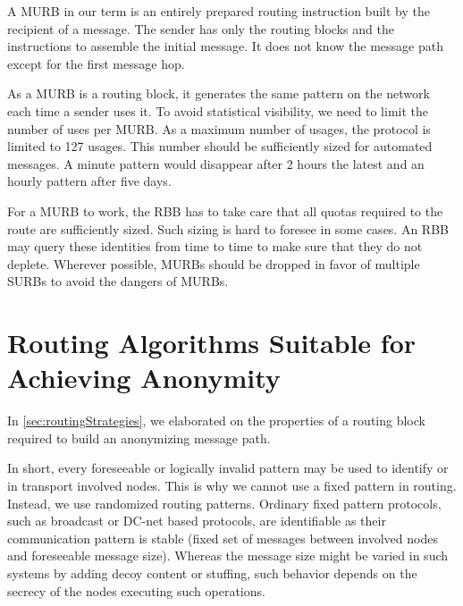 A MURB in our term is an entirely prepared routing instruction built by the recipient of a message. The sender has only the routing blocks and the instructions to assemble the initial message. It does not know the message path except for the first message hop.

As a MURB is a routing block, it generates the same pattern on the network each time a sender uses it. To avoid statistical visibility, we need to limit the number of uses per MURB. As a maximum number of usages, the protocol is limited to 127 usages. This number should be sufficiently sized for automated messages. A minute pattern would disappear after 2 hours the latest and an hourly pattern after five days.

For a MURB to work, the RBB has to take care that all quotas required to the route are sufficiently sized. Such sizing is hard to foresee in some cases. An RBB may query these identities from time to time to make sure that they do not deplete. Wherever possible, MURBs should be dropped in favor of multiple SURBs to avoid the dangers of MURBs.

\section{Routing Algorithms Suitable for Achieving Anonymity\label{sec:routingAlgorithm}}
In \cref{sec:routingStrategies}, we elaborated on the properties of a routing block required to build an anonymizing message path.

In short, every foreseeable or logically invalid pattern may be used to identify \VortexMessages{} or in transport involved nodes. This is why we cannot use a fixed pattern in routing. Instead, we use randomized routing patterns. Ordinary fixed pattern protocols, such as broadcast or DC-net based protocols, are identifiable as their communication pattern is stable (fixed set of messages between involved nodes and foreseeable message size). Whereas the message size might be varied in such systems by adding decoy content or stuffing, such behavior depends on the secrecy of the nodes executing such operations.

